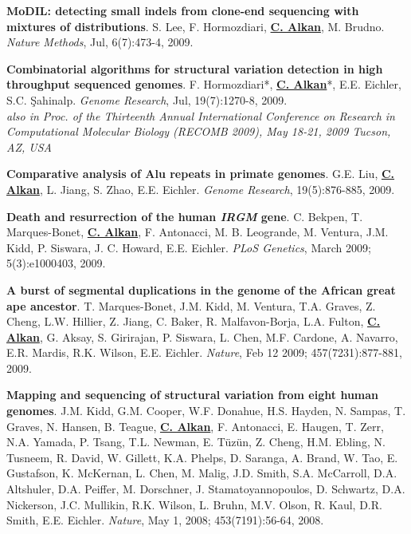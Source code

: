\documentclass[margin,line]{res}
\begin{document}
\begin{resume}
\vspace{-.2cm}
{\bf MoDIL: detecting small indels from clone-end sequencing with mixtures of distributions}.
S. Lee, F. Hormozdiari, {\bf {\underline{C. Alkan}}}, M. Brudno.
{\em Nature Methods},  Jul, 6(7):473-4, 2009.


\clearpage
\vspace{-.2cm}
{\bf  Combinatorial algorithms for structural variation detection in high throughput sequenced genomes}.
F. Hormozdiari*, {\bf {\underline{C. Alkan}}}*, E.E. Eichler, S.C. \c{S}ahinalp. 
{\em Genome Research}, Jul, 19(7):1270-8, 2009.\\
\hspace*{1cm} {\footnotesize {\it also in Proc. of the
 Thirteenth Annual International Conference on Research in Computational Molecular 
Biology (RECOMB 2009), May 18-21, 2009 Tucson, AZ, USA}}

\vspace{-.2cm}

{\bf Comparative analysis of Alu repeats in primate genomes}.  G.E. Liu, {\bf {\underline{C. Alkan}}}, L. Jiang, S. Zhao, E.E. Eichler. 
{\em Genome Research}, 19(5):876-885, 2009.

\vspace{-.2cm}
{\bf Death and resurrection of the human {\em IRGM} gene}. C. Bekpen, T. Marques-Bonet,
{\bf {\underline{C. Alkan}}}, F. Antonacci, M. B. Leogrande, M. Ventura, J.M. Kidd, P. Siswara, J. C. Howard, E.E. Eichler. {\em PLoS Genetics}, March 2009; 5(3):e1000403, 2009.

\vspace{-.2cm}

{\bf A burst of segmental duplications in the genome of the African great ape ancestor}. T. Marques-Bonet, J.M. Kidd, M. Ventura, T.A. Graves, Z. Cheng, L.W. Hillier, Z. Jiang, 
C. Baker, R. Malfavon-Borja, L.A. Fulton, {\bf {\underline{C. Alkan}}}, G. Aksay, S. Girirajan,
 P. Siswara, L. Chen, M.F. Cardone, A. Navarro, E.R. Mardis,
 R.K. Wilson, E.E. Eichler. {\em Nature}, Feb 12 2009; 457(7231):877-881, 2009.


\vspace{-.2cm}
 {\bf Mapping and sequencing of structural variation from eight human genomes}.
 J.M. Kidd, G.M. Cooper, W.F. Donahue, H.S. Hayden, 
 N. Sampas, T. Graves, N. Hansen, B. Teague, {\bf {\underline{C. Alkan}}},  F. Antonacci, 
 E. Haugen, T. Zerr, N.A. Yamada, P. Tsang,  T.L. Newman, E. T\"{u}z\"{u}n, 
 Z. Cheng, H.M. Ebling, N. Tusneem, R. David, W. Gillett, K.A. Phelps, 
 D. Saranga, A. Brand, W. Tao, E. Gustafson, K. McKernan, L. Chen, 
 M. Malig, J.D. Smith, S.A. McCarroll, D.A. Altshuler,  
 D.A. Peiffer, M. Dorschner, J. Stamatoyannopoulos, D. Schwartz,  
 D.A. Nickerson, J.C. Mullikin, R.K. Wilson, L. Bruhn, 
 M.V. Olson, R. Kaul, D.R. Smith, E.E. Eichler.
 {\em Nature}, May 1, 2008; 453(7191):56-64, 2008.


\end{resume}
\end{document}
